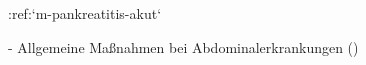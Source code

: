 %
:ref:`m-pankreatitis-akut`%
\begin{itemize}
  -   Allgemeine Maßnahmen bei Abdominalerkrankungen
  ()
\end{itemize}